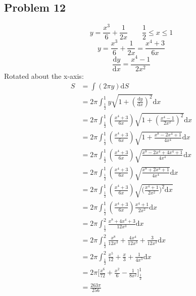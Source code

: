 \documentclass[letterpaper, 12pt]{article}
\newcommand*{\diff}{\mathrm{d}}
\begin{document}
\subsection*{Problem 12}
\[ y = \frac{x^{3}}{6}+\frac{1}{2x} \quad \quad \frac{1}{2} \leq x \leq 1 \]
\[ y = \frac{x^{3}}{6}+\frac{1}{2x} = \frac{x^{4}+3}{6x} \]
\[ \frac{\diff{y}}{\diff{x}} = \frac{x^{4}-1}{2x^{2}} \]
Rotated about the x-axis:
\begin{align*}
  S &= \int(2\pi y)\diff{S} \\
  &= 2\pi\int_{\frac{1}{2}}^{1}{
    y\sqrt{1+(\frac{\diff{y}}{\diff{x}})^{2}}\diff{x}} \\
  &= 2\pi\int_{\frac{1}{2}}^{1}{(\frac{x^{4}+3}{6x})
    \sqrt{1+(\frac{x^{4}-1}{2x^{2}})^{2}}\diff{x}} \\
  &= 2\pi\int_{\frac{1}{2}}^{1}{(\frac{x^{4}+3}{6x})
    \sqrt{1+\frac{x^{8}-2x^{4}+1}{4x^{4}}}\diff{x}} \\
  &= 2\pi\int_{\frac{1}{2}}^{1}{(\frac{x^{4}+3}{6x})
    \sqrt{\frac{x^{8}-2x^{4}+4x^{4}+1}{4x^{4}}}\diff{x}} \\
  &= 2\pi\int_{\frac{1}{2}}^{1}{(\frac{x^{4}+3}{6x})
    \sqrt{\frac{x^{8}+2x^{4}+1}{4x^{4}}}\diff{x}} \\
  &= 2\pi\int_{\frac{1}{2}}^{1}{(\frac{x^{4}+3}{6x})
    \sqrt{\bigg(\frac{x^{4}+1}{2x^{2}}\bigg)^{2}\diff{x}}} \\
  &= 2\pi\int_{\frac{1}{2}}^{1}{(\frac{x^{4}+3}{6x})
    \frac{x^{4}+1}{2x^{2}}\diff{x}} \\
  &= 2\pi\int_{\frac{1}{2}}^{2}{\frac{x^{8}+4x^{4}+3}{12x^{3}}\diff{x}} \\
  &= 2\pi\int_{\frac{1}{2}}^{2}{
    \frac{x^{8}}{12x^{3}}+\frac{4x^{4}}{12x^{3}}+\frac{3}{12x^{3}}\diff{x}} \\
  &= 2\pi\int_{\frac{1}{2}}^{2}{
    \frac{x^{5}}{12}+\frac{x}{3}+\frac{1}{4x^{3}}\diff{x}} \\
  &= 2\pi\bigg[\frac{x^{6}}{72}+\frac{x^{2}}{6}-\frac{1}{8x^{2}}\bigg]
    _{\frac{1}{2}}^{1} \\
  &= \frac{263\pi}{256}
\end{align*}
\end{document}
